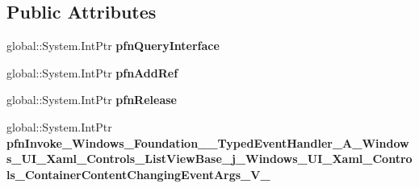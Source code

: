 \subsection*{Public Attributes}
\begin{DoxyCompactItemize}
\item 
\mbox{\label{struct_windows_1_1_foundation_1_1_typed_event_handler___a___windows___u_i___xaml___controls___libdb9ee787e603cdc08b3e175469ff6f2_a7e8152545a3bc0f8bf1e1fd2dc0e612f}} 
global\+::\+System.\+Int\+Ptr {\bfseries pfn\+Query\+Interface}
\item 
\mbox{\label{struct_windows_1_1_foundation_1_1_typed_event_handler___a___windows___u_i___xaml___controls___libdb9ee787e603cdc08b3e175469ff6f2_a34826279de34f0b147c4517932674fbc}} 
global\+::\+System.\+Int\+Ptr {\bfseries pfn\+Add\+Ref}
\item 
\mbox{\label{struct_windows_1_1_foundation_1_1_typed_event_handler___a___windows___u_i___xaml___controls___libdb9ee787e603cdc08b3e175469ff6f2_ae6849054c363c35c7ea6f31158255e42}} 
global\+::\+System.\+Int\+Ptr {\bfseries pfn\+Release}
\item 
\mbox{\label{struct_windows_1_1_foundation_1_1_typed_event_handler___a___windows___u_i___xaml___controls___libdb9ee787e603cdc08b3e175469ff6f2_a947ab9c86df65a153a53655c7dc0d755}} 
global\+::\+System.\+Int\+Ptr {\bfseries pfn\+Invoke\+\_\+\+Windows\+\_\+\+Foundation\+\_\+\+\_\+\+Typed\+Event\+Handler\+\_\+\+A\+\_\+\+Windows\+\_\+\+U\+I\+\_\+\+Xaml\+\_\+\+Controls\+\_\+\+List\+View\+Base\+\_\+j\+\_\+\+Windows\+\_\+\+U\+I\+\_\+\+Xaml\+\_\+\+Controls\+\_\+\+Container\+Content\+Changing\+Event\+Args\+\_\+\+V\+\_\+}
\end{DoxyCompactItemize}
